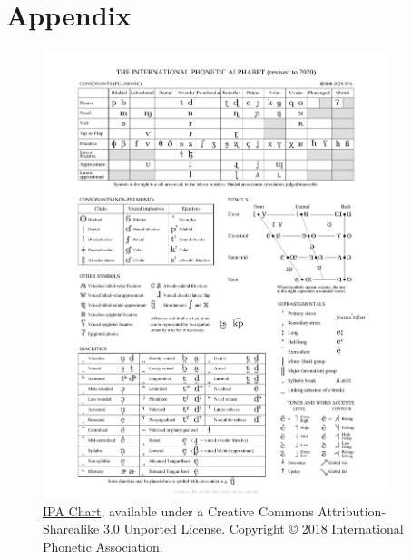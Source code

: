 \chapter{Appendix}\label{chapter:appendix}

\begin{figure}
    \centering
    \includegraphics[width=0.9\textwidth]{figures/IPA_unitipa_2020_full.pdf}
    \caption{\href{http://www.internationalphoneticassociation.org/content/ipa-chart}{IPA Chart}, available under a Creative Commons Attribution-Sharealike 3.0 Unported License. 
    Copyright © 2018 International Phonetic Association.}
    \label{fig:ipa_chart}
\end{figure}